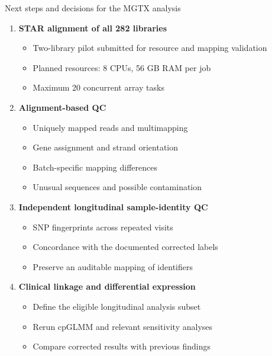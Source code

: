 \documentclass[10pt,aspectratio=169]{beamer}
\begin{document}
\begin{frame}{Next steps and decisions for the MGTX analysis}
	
	\begin{enumerate}
		
		\item \textbf{STAR alignment of all 282 libraries}
		
		\begin{itemize}
			\item Two-library pilot submitted for resource
			and mapping validation
			\item Planned resources: 8 CPUs, 56 GB RAM per job
			\item Maximum 20 concurrent array tasks
		\end{itemize}
		
		\vspace{0.13cm}
		
		\item \textbf{Alignment-based QC}
		
		\begin{itemize}
			\item Uniquely mapped reads and multimapping
			\item Gene assignment and strand orientation
			\item Batch-specific mapping differences
			\item Unusual sequences and possible contamination
		\end{itemize}
		
		\vspace{0.13cm}
		
		\item \textbf{Independent longitudinal sample-identity QC}
		
		\begin{itemize}
			\item SNP fingerprints across repeated visits
			\item Concordance with the documented corrected labels
			\item Preserve an auditable mapping of identifiers
		\end{itemize}
		
		\vspace{0.13cm}
		
		\item \textbf{Clinical linkage and differential expression}
		
		\begin{itemize}
			\item Define the eligible longitudinal analysis subset
			\item Rerun cpGLMM and relevant sensitivity analyses
			\item Compare corrected results with previous findings
		\end{itemize}
		

\end{enumerate}
\end{frame}
\end{document}
